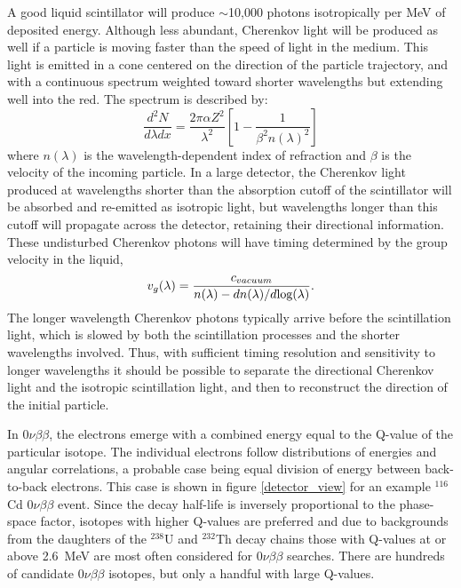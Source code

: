 \documentclass[cits]{JINST}
\begin{document}
A good liquid scintillator will produce $\sim$10,000 photons
isotropically per MeV of deposited energy. Although less abundant,
Cherenkov light will be produced as well if a particle is moving
faster than the speed of light in the medium.  This light is emitted
in a cone centered on the direction of the particle trajectory, and
with a continuous spectrum weighted toward shorter wavelengths but
extending well into the red. The spectrum is described
by\cite{Cherenkov34}:
\begin{equation}
\label{eqCherenkov}
\frac{d^2N}{d\lambda dx} = \frac{2 \pi \alpha Z^2}{\lambda^2} \left [ 1 - \frac{1}{\beta^2 n(\lambda)^2} \right ]
\end{equation}
where $n(\lambda)$ is the wavelength-dependent index of refraction and
$\beta$ is the velocity of the incoming particle. In a large detector,
the Cherenkov light produced at wavelengths shorter than the
absorption cutoff of the scintillator will be absorbed and re-emitted
as isotropic light, but wavelengths longer than this cutoff will
propagate across the detector, retaining their directional
information. These undisturbed Cherenkov
photons will have timing determined by the group 
velocity\cite{group_velocity_article,pdg_review_2012,tamm1939} in the liquid,
\begin{equation}
\label{eqGroup}
v_{g}(\lambda) = \frac{c_{vacuum}}{n(\lambda) - dn(\lambda)/d\textnormal{log}(\lambda)}.
\end{equation}
The longer wavelength Cherenkov photons typically arrive before the
scintillation light, which is slowed by both the scintillation
processes and the shorter wavelengths involved. Thus, with sufficient
timing resolution and sensitivity to longer wavelengths it should be
possible to separate the directional Cherenkov light and the isotropic
scintillation light, and then to reconstruct the direction of the
initial particle.

In $0\nu\beta\beta$, the electrons emerge with a combined energy equal
to the Q-value of the particular isotope. The individual
electrons follow distributions of energies and angular correlations, 
a probable case being equal division of energy between back-to-back
electrons\cite{phasespace}. This case is shown in figure \ref{detector_view}
for an example $^{116}$Cd $0\nu\beta\beta$ event. Since the decay
half-life is inversely proportional to the phase-space factor, isotopes with
higher Q-values are preferred and due to backgrounds from the daughters
of the $^{238}$U and $^{232}$Th decay chains those with Q-values at or
above 2.6~MeV are most often considered for $0\nu\beta\beta$ searches.
There are hundreds of candidate $0\nu\beta\beta$ isotopes\cite{tabledbb},
but only a handful with large Q-values. 
\end{document}
